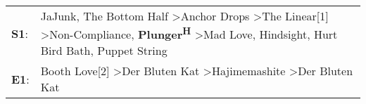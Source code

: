 \begin{supertabular}{p{0.03\textwidth}p{0.92\textwidth}}
 \textbf{S1}:  &  JaJunk\textsuperscript{}, \enspace The Bottom Half\textsuperscript{} \textgreater \enspace Anchor Drops\textsuperscript{} \textgreater \enspace The Linear[1]\textsuperscript{} \textgreater \enspace Non-Compliance\textsuperscript{}, \enspace \textbf{Plunger\textsuperscript{H}} \textgreater \enspace Mad Love\textsuperscript{}, \enspace Hindsight\textsuperscript{}, \enspace Hurt Bird Bath\textsuperscript{}, \enspace Puppet String\textsuperscript{}  \enspace  \\
 \textbf{E1}:  &                                                                                                                                                                                                                                                               Booth Love[2]\textsuperscript{} \textgreater \enspace Der Bluten Kat\textsuperscript{} \textgreater \enspace Hajimemashite\textsuperscript{} \textgreater \enspace Der Bluten Kat\textsuperscript{}  \enspace  \\
\end{supertabular}
